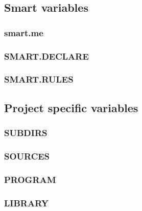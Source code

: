 \subsection{Smart variables}
\subsubsection{smart.me}
\subsubsection{SMART.DECLARE}
\subsubsection{SMART.RULES}
\subsection{Project specific variables}
\subsubsection{SUBDIRS}
\subsubsection{SOURCES}
\subsubsection{PROGRAM}
\subsubsection{LIBRARY}
